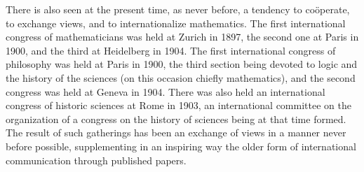 \documentclass[oneside]{book}
\begin{document}
{There is also seen at the present time, as never before, a
tendency to co\"operate, to exchange views, and to internationalize
mathematics. The first international congress of mathematicians
was held at Zurich in 1897, the second one at Paris in 1900, and
the third at Heidelberg in 1904. The first international congress
of philosophy was held at Paris in 1900, the third section
being devoted to logic and the history of the sciences (on this
occasion chiefly mathematics), and the second congress was
held at Geneva in 1904. There was also held an international
congress of historic sciences at Rome in 1903, an international
committee on the organization of a congress on the history of
sciences being at that time formed. The result of such gatherings
has been an exchange of views in a manner never before
possible, supplementing in an inspiring way the older form of
international communication through published papers.

}
\end{document}
